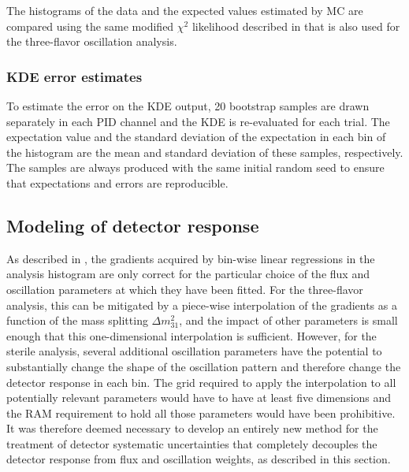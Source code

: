 The histograms of the data and the expected values estimated by MC are compared using the same modified $\chi^2$ likelihood described in  that is also used for the three-flavor oscillation analysis.

\subsubsection{KDE error estimates}
To estimate the error on the KDE output, 20 bootstrap samples are drawn separately in each PID channel and the KDE is re-evaluated for each trial. The expectation value and the standard deviation of the expectation in each bin of the histogram are the mean and standard deviation of these samples, respectively. The samples are always produced with the same initial random seed to ensure that expectations and errors are reproducible.

\subsection{Modeling of detector response}
\label{sec:ultrasurfaces}

 As described in , the gradients acquired by bin-wise linear regressions in the analysis histogram are only correct for the particular choice of the flux and oscillation parameters at which they have been fitted. For the three-flavor analysis, this can be mitigated by a piece-wise interpolation of the gradients as a function of the mass splitting $\Delta m^2_{31}$, and the impact of other parameters is small enough that this one-dimensional interpolation is sufficient. However, for the sterile analysis, several additional oscillation parameters have the potential to substantially change the shape of the oscillation pattern and therefore change the detector response in each bin. The grid required to apply the interpolation to all potentially relevant parameters would have to have at least five dimensions and the RAM requirement to hold all those parameters would have been prohibitive. It was therefore deemed necessary to develop an entirely new method for the treatment of detector systematic uncertainties that completely decouples the detector response from flux and oscillation weights, as described in this section.

